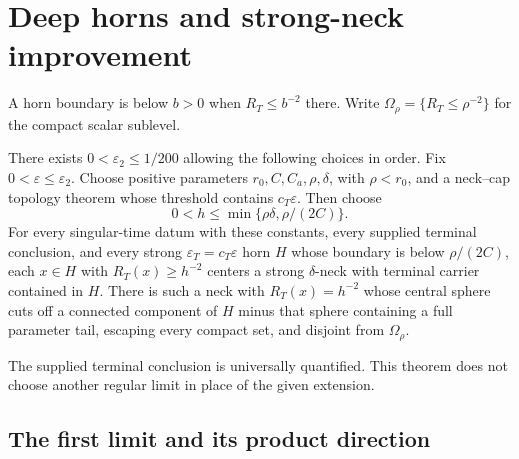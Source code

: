\section{Deep horns and strong-neck improvement}
\label{sec:singular-deep-horn}

A horn boundary is below $b>0$ when $R_T\leq b^{-2}$ there.
Write $\Omega_\rho=\{R_T\leq\rho^{-2}\}$ for the compact scalar sublevel.

\begin{theorem}
\label{thm:singular-m32}
There exists $0<\varepsilon_2\leq1/200$ allowing the following choices
in order. Fix $0<\varepsilon\leq\varepsilon_2$.
Choose positive parameters $r_0,C,C_a,\rho,\delta$, with $\rho<r_0$,
and a neck--cap topology theorem whose threshold contains
$c_T\varepsilon$. Then choose
\begin{equation}
                   0<h\leq\min\{\rho\delta,\rho/(2C)\}.
 \label{eq:deep-height}
\end{equation}
For every singular-time datum with these constants, every supplied
terminal conclusion, and every strong $\varepsilon_T=c_T\varepsilon$
horn $H$ whose boundary is below $\rho/(2C)$, each $x\in H$ with
$R_T(x)\geq h^{-2}$ centers a strong $\delta$-neck with terminal carrier
contained in $H$. There is such a neck with $R_T(x)=h^{-2}$ whose central
sphere cuts off a connected component of $H$ minus that sphere containing
a full parameter tail, escaping every compact set, and disjoint from
$\Omega_\rho$.
\end{theorem}

The supplied terminal conclusion is universally quantified. This theorem
does not choose another regular limit in place of the given extension.

\subsection{The first limit and its product direction}

